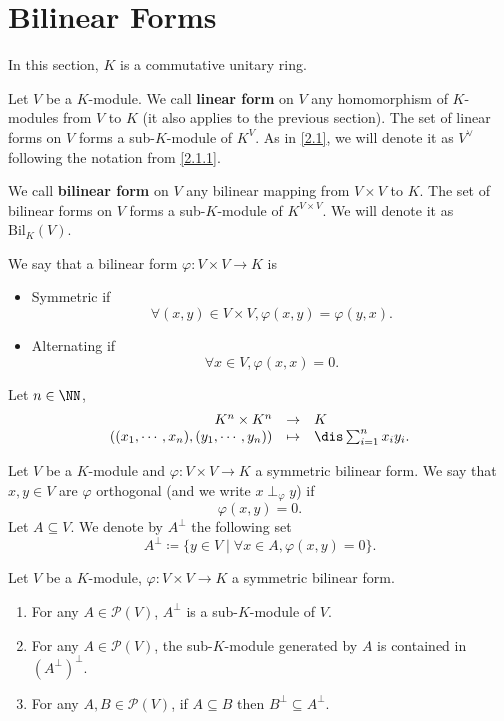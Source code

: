 \section{Bilinear Forms}
\quad In this section, $K$ is a commutative unitary ring.
\begin{definitionenv}
    Let $V$ be a $K$-module. We call \textbf{linear form} on $V$ any homomorphism of $K$-modules from $V$ to $K$ (it also applies to the previous section).
    The set of linear forms on $V$ forms a sub-$K$-module of $K^V$. As in \ref{2.1}, we will denote it as $V^\vee$ following the notation from \ref{2.1.1}.
    
    \quad We call \textbf{bilinear form} on $V$ any bilinear mapping from $V\times V$ to $K$.
    The set of bilinear forms on $V$ forms a sub-$K$-module of $K^{V\times V}$. We will denote it as $\mathrm{Bil}_K\left(V\right)$.
    
    \quad We say that a bilinear form $\varphi: V\times V\rightarrow K$ is
    \begin{itemize}
        \item Symmetric if
        $$\forall (x,y)\in V\times V, \varphi(x,y) = \varphi(y,x).$$
        \item Alternating if
        $$ \forall x\in V, \varphi (x,x) = 0.$$
    \end{itemize}
\end{definitionenv}
\begin{exampleenv}
    Let $n\in \NN$,
    $$ \begin{array}{rcl}
        K^n\times K^n & \rightarrow & K\\
        \left((x_1,\cdots,x_n), (y_1,\cdots,y_n)\right) & \mapsto & \dis \sum_{i=1}^{n} x_i y_i.
    \end{array}$$
\end{exampleenv}
\begin{definitionenv}
    Let $V$ be a $K$-module and $\varphi: V\times V \rightarrow K$ a symmetric bilinear form. We say that $x,y \in V$ are $\varphi$ orthogonal (and we write $x \perp_\varphi y$) if
    $$ \varphi\left(x,y\right) = 0.$$
    Let $A\subseteq V$. We denote by $A^\perp$ the following set
    $$ A^\perp \coloneq \{y\in V\mid \forall x\in A, \varphi (x,y) = 0\}.$$
\end{definitionenv}
\begin{propositionenv}
    Let $V$ be a $K$-module, $\varphi:V\times V\rightarrow K$ a symmetric bilinear form.
    \begin{enumerate}
        \item For any $A\in \mathscr{P}(V)$, $A^\perp$ is a sub-$K$-module of $V$.
        \item For any $A\in \mathscr{P}(V)$, the sub-$K$-module generated by $A$ is contained in $\left(A^\perp\right)^\perp$.
        \item For any $A,B\in \mathscr{P}(V)$, if $A\subseteq B$ then $B^\perp\subseteq A^\perp$. 
    \end{enumerate}
\end{propositionenv}
